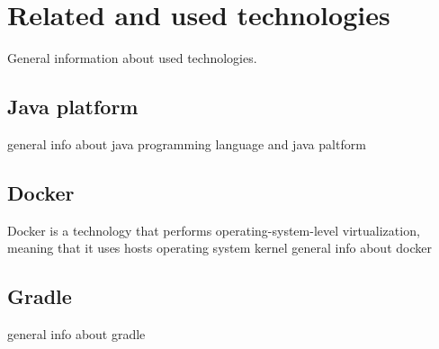 \section{Related and used technologies}\label{sec:related-technologies}
General information about used technologies.

\subsection{Java platform}\label{subsec:tech-java}
general info about java programming language and java paltform

\subsection{Docker}\label{subsec:tech-docker}
Docker is a technology that performs operating-system-level virtualization,
meaning that it uses hosts operating system kernel
general info about docker 

\subsection{Gradle}\label{subsec:tech-gradle}
general info about gradle
